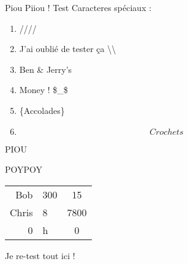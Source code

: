 
Piou Piiou !
Test Caracteres spéciaux :
\begin{enumerate}
\item \backslasho/\backslasho/\backslasho/\backslasho/
\item J'ai oublié de tester ça \backslash\backslash
\item Ben \& Jerry's
\item Money ! \$_\$
$$ $$ $$$$$$$$$$$$
\item \{Accolades\}
\item \[Crochets\]
\end{enumerate}

\begin{itemize}
\itemPIOU PIOU
\begin{enumerate}
\end{enumerate}
\itemPILPIL
\end{itemize}
POYPOY
\begin{enumerate}
\end{enumerate}
\begin{tabular}{rlc}
Bob & 300 & 15 \\
Chris & 8 & 7800 \\
0 & h & 0 \\
\end{tabular}
Je re-test tout ici !

